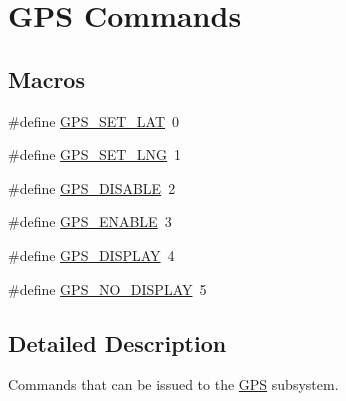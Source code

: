 \hypertarget{group__gps__commands}{\section{G\-P\-S Commands}
\label{group__gps__commands}
}
\subsection*{Macros}
\begin{DoxyCompactItemize}
\item 
\#define \hyperlink{group__gps__commands_gaac31d4fc4681381604fdbf78b5aa7599}{G\-P\-S\-\_\-\-S\-E\-T\-\_\-\-L\-A\-T}~0
\item 
\#define \hyperlink{group__gps__commands_gafe7ed49e1848a16fd15d1643b4c4c36b}{G\-P\-S\-\_\-\-S\-E\-T\-\_\-\-L\-N\-G}~1
\item 
\#define \hyperlink{group__gps__commands_ga8e394314aacedb0790203d4af6cd5710}{G\-P\-S\-\_\-\-D\-I\-S\-A\-B\-L\-E}~2
\item 
\#define \hyperlink{group__gps__commands_gac8383d8fc4fa97bb45f89d9a50e0966d}{G\-P\-S\-\_\-\-E\-N\-A\-B\-L\-E}~3
\item 
\#define \hyperlink{group__gps__commands_gad25ca4dcc3aa69da0e474e3b69cc910a}{G\-P\-S\-\_\-\-D\-I\-S\-P\-L\-A\-Y}~4
\item 
\#define \hyperlink{group__gps__commands_ga3de45ac0f8b80c8044b533d47cf08e99}{G\-P\-S\-\_\-\-N\-O\-\_\-\-D\-I\-S\-P\-L\-A\-Y}~5
\end{DoxyCompactItemize}


\subsection{Detailed Description}
Commands that can be issued to the \hyperlink{classGPS}{G\-P\-S} subsystem. 

